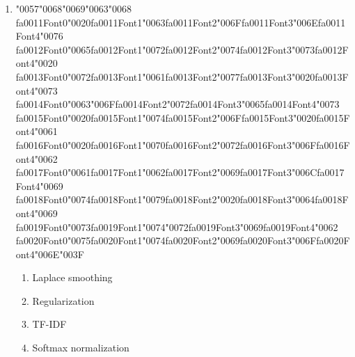 \documentclass[12pt]{article}
\begin{document}
\begin{enumerate}[label=Q\arabic*.]
\item {\char"0057}{\char"0068}{\char"0069}{\char"0063}{\char"0068} {\csname fa0011Font0\endcsname\char"0020}{\csname fa0011Font1\endcsname\char"0063}{\csname fa0011Font2\endcsname\char"006F}{\csname fa0011Font3\endcsname\char"006E}{\csname fa0011Font4\endcsname\char"0076} {\csname fa0012Font0\endcsname\char"0065}{\csname fa0012Font1\endcsname\char"0072}{\csname fa0012Font2\endcsname\char"0074}{\csname fa0012Font3\endcsname\char"0073}{\csname fa0012Font4\endcsname\char"0020} {\csname fa0013Font0\endcsname\char"0072}{\csname fa0013Font1\endcsname\char"0061}{\csname fa0013Font2\endcsname\char"0077}{\csname fa0013Font3\endcsname\char"0020}{\csname fa0013Font4\endcsname\char"0073} {\csname fa0014Font0\endcsname\char"0063}{\char"006F}{\csname fa0014Font2\endcsname\char"0072}{\csname fa0014Font3\endcsname\char"0065}{\csname fa0014Font4\endcsname\char"0073} {\csname fa0015Font0\endcsname\char"0020}{\csname fa0015Font1\endcsname\char"0074}{\csname fa0015Font2\endcsname\char"006F}{\csname fa0015Font3\endcsname\char"0020}{\csname fa0015Font4\endcsname\char"0061} {\csname fa0016Font0\endcsname\char"0020}{\csname fa0016Font1\endcsname\char"0070}{\csname fa0016Font2\endcsname\char"0072}{\csname fa0016Font3\endcsname\char"006F}{\csname fa0016Font4\endcsname\char"0062} {\csname fa0017Font0\endcsname\char"0061}{\csname fa0017Font1\endcsname\char"0062}{\csname fa0017Font2\endcsname\char"0069}{\csname fa0017Font3\endcsname\char"006C}{\csname fa0017Font4\endcsname\char"0069} {\csname fa0018Font0\endcsname\char"0074}{\csname fa0018Font1\endcsname\char"0079}{\csname fa0018Font2\endcsname\char"0020}{\csname fa0018Font3\endcsname\char"0064}{\csname fa0018Font4\endcsname\char"0069} {\csname fa0019Font0\endcsname\char"0073}{\csname fa0019Font1\endcsname\char"0074}{\char"0072}{\csname fa0019Font3\endcsname\char"0069}{\csname fa0019Font4\endcsname\char"0062} {\csname fa0020Font0\endcsname\char"0075}{\csname fa0020Font1\endcsname\char"0074}{\csname fa0020Font2\endcsname\char"0069}{\csname fa0020Font3\endcsname\char"006F}{\csname fa0020Font4\endcsname\char"006E}{\char"003F}
\begin{enumerate}[label=(\Alph*)]
    \item Laplace smoothing
    \item Regularization
    \item TF-IDF
    \item Softmax normalization
\end{enumerate}

\end{enumerate}
\end{document}

